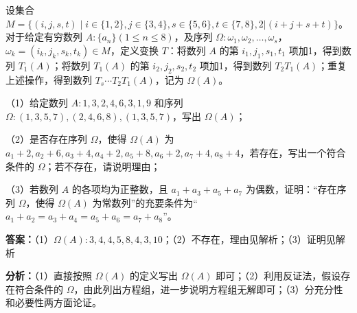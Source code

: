 \begin{question}[points=14]
设集合 $M = \{(i,j,s,t) \mid i\in\{1,2\}, j\in\{3,4\}, s\in\{5,6\}, t\in\{7,8\}, 2|(i+j+s+t)\}$。对于给定有穷数列 $A:\{a_n\}(1\leq n\leq 8)$，及序列 $\Omega:\omega_1,\omega_2,\dots,\omega_s$，$\omega_k=(i_k,j_k,s_k,t_k)\in M$，定义变换 $T$：将数列 $A$ 的第 $i_1,j_1,s_1,t_1$ 项加1，得到数列 $T_1(A)$；将数列 $T_1(A)$ 的第 $i_2,j_2,s_2,t_2$ 项加1，得到数列 $T_2T_1(A)$；重复上述操作，得到数列 $T_s\cdots T_2T_1(A)$，记为 $\Omega(A)$。

（1）给定数列 $A:1,3,2,4,6,3,1,9$ 和序列 $\Omega:(1,3,5,7),(2,4,6,8),(1,3,5,7)$，写出 $\Omega(A)$；

（2）是否存在序列 $\Omega$，使得 $\Omega(A)$ 为 $a_1+2, a_2+6, a_3+4, a_4+2, a_5+8, a_6+2, a_7+4, a_8+4$，若存在，写出一个符合条件的 $\Omega$；若不存在，请说明理由；

（3）若数列 $A$ 的各项均为正整数，且 $a_1+a_3+a_5+a_7$ 为偶数，证明：“存在序列 $\Omega$，使得 $\Omega(A)$ 为常数列”的充要条件为“$a_1+a_2=a_3+a_4=a_5+a_6=a_7+a_8$”。
\begin{solution}
\textbf{答案：}（1）$\Omega(A):3,4,4,5,8,4,3,10$；（2）不存在，理由见解析；（3）证明见解析

\textbf{分析：}（1）直接按照 $\Omega(A)$ 的定义写出 $\Omega(A)$ 即可；（2）利用反证法，假设存在符合条件的 $\Omega$，由此列出方程组，进一步说明方程组无解即可；（3）分充分性和必要性两方面论证。


\end{solution}
\end{question}
